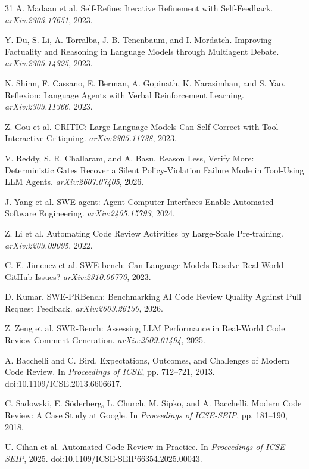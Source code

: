 \documentclass[acmsmall,screen,review,anonymous]{acmart}
\begin{document}
\begin{thebibliography}{31}
A. Madaan et al. Self-Refine: Iterative Refinement with Self-Feedback. \emph{arXiv:2303.17651}, 2023.

Y. Du, S. Li, A. Torralba, J. B. Tenenbaum, and I. Mordatch. Improving Factuality and Reasoning in Language Models through Multiagent Debate. \emph{arXiv:2305.14325}, 2023.

N. Shinn, F. Cassano, E. Berman, A. Gopinath, K. Narasimhan, and S. Yao. Reflexion: Language Agents with Verbal Reinforcement Learning. \emph{arXiv:2303.11366}, 2023.

Z. Gou et al. CRITIC: Large Language Models Can Self-Correct with Tool-Interactive Critiquing. \emph{arXiv:2305.11738}, 2023.

V. Reddy, S. R. Challaram, and A. Basu. Reason Less, Verify More: Deterministic Gates Recover a Silent Policy-Violation Failure Mode in Tool-Using LLM Agents. \emph{arXiv:2607.07405}, 2026.

J. Yang et al. SWE-agent: Agent-Computer Interfaces Enable Automated Software Engineering. \emph{arXiv:2405.15793}, 2024.

Z. Li et al. Automating Code Review Activities by Large-Scale Pre-training. \emph{arXiv:2203.09095}, 2022.

C. E. Jimenez et al. SWE-bench: Can Language Models Resolve Real-World GitHub Issues? \emph{arXiv:2310.06770}, 2023.

D. Kumar. SWE-PRBench: Benchmarking AI Code Review Quality Against Pull Request Feedback. \emph{arXiv:2603.26130}, 2026.

Z. Zeng et al. SWR-Bench: Assessing LLM Performance in Real-World Code Review Comment Generation. \emph{arXiv:2509.01494}, 2025.

A. Bacchelli and C. Bird. Expectations, Outcomes, and Challenges of Modern Code Review. In \emph{Proceedings of ICSE}, pp. 712--721, 2013. doi:10.1109/ICSE.2013.6606617.

C. Sadowski, E. S\"oderberg, L. Church, M. Sipko, and A. Bacchelli. Modern Code Review: A Case Study at Google. In \emph{Proceedings of ICSE-SEIP}, pp. 181--190, 2018.

U. Cihan et al. Automated Code Review in Practice. In \emph{Proceedings of ICSE-SEIP}, 2025. doi:10.1109/ICSE-SEIP66354.2025.00043.


\end{thebibliography}
\end{document}
